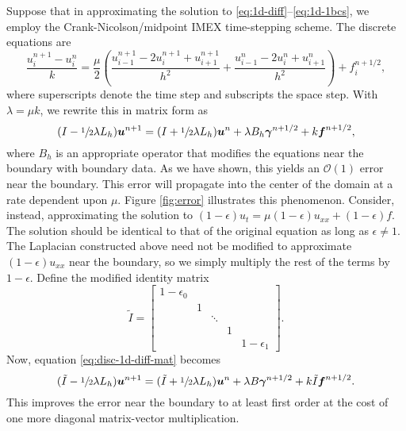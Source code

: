 Suppose that in approximating the solution to \eqref{eq:1d-diff}--\eqref{eq:1d-1bcs}, we
employ the Crank-Ni\-col\-son/midpoint IMEX time-stepping scheme. The discrete equations
are
\begin{equation}
    \frac{u_i^{n+1}-u_i^n}{k} = \frac{\mu}2\left(\frac{u_{i-1}^{n+1}-2u_i^{n+1}+u_{i+1}^{n+1}}{h^2} + \frac{u_{i-1}^n-2u_i^n+u_{i+1}^n}{h^2}\right) + f_i^{n+1/2},
    \label{eq:disc-1d-diff}
\end{equation}
where superscripts denote the time step and subscripts the space step. With
$\lambda=\mu k$, we rewrite this in matrix form as
\begin{equation}
    (I-\sfrac12\lambda L_h)\boldsymbol{u}^{n+1} = (I+\sfrac12\lambda L_h)\boldsymbol{u}^n + \lambda B_h\boldsymbol{\gamma}^{n+1/2} + k\boldsymbol{f}^{n+1/2},
    \label{eq:disc-1d-diff-mat}
\end{equation}
where $B_h$ is an appropriate operator that modifies the equations near the boundary with
boundary data. As we have shown, this yields an $\mathcal{O}(1)$ error near the boundary.
This error will propagate into the center of the domain at a rate dependent upon $\mu$.
Figure \ref{fig:error} illustrates this phenomenon. Consider, instead, approximating the
solution to $(1-\epsilon) u_t = \mu (1-\epsilon) u_{xx} + (1-\epsilon) f$. The solution
should be identical to that of the original equation as long as $\epsilon\neq 1$. The
Laplacian constructed above need not be modified to approximate $(1-\epsilon) u_{xx}$
near the boundary, so we simply multiply the rest of the terms by $1-\epsilon$. Define
the modified identity matrix
\begin{equation}
    \tilde{I} = \left[\begin{array}{ccccc}
            1-\epsilon_0 &   &        &   &         \\
                         & 1 &        &   &         \\
                         &   & \ddots &   &         \\
                         &   &        & 1 &         \\
                         &   &        &   & 1-\epsilon_1
            \end{array}\right].
    \label{eq:mod-ident}
\end{equation}
Now, equation \eqref{eq:disc-1d-diff-mat} becomes
\begin{equation}
    (\tilde{I}-\sfrac12\lambda L_h)\boldsymbol{u}^{n+1} = (\tilde{I}+\sfrac12\lambda L_h)\boldsymbol{u}^n + \lambda B\boldsymbol{\gamma}^{n+1/2} + k\tilde{I}\boldsymbol{f}^{n+1/2}.
    \label{eq:1d-diff-mat}
\end{equation}
This improves the error near the boundary to at least first order at the cost of one more
diagonal matrix-vector multiplication.

